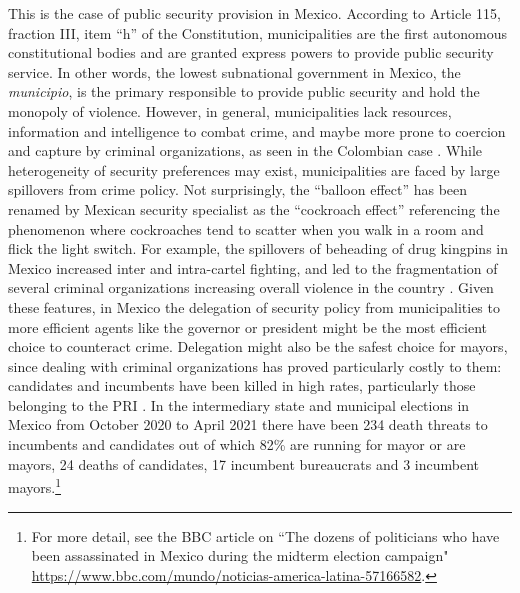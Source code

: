 This is the case of public security provision in Mexico. According to Article 115, fraction III, item ``h'' of the Constitution, municipalities are the first autonomous constitutional bodies and are granted express powers to provide public security service. In other words, the lowest subnational government in Mexico, the \emph{municipio}, is the primary responsible to provide public security and hold the monopoly of violence. However, in general, municipalities lack resources, information and intelligence to combat crime, and maybe more prone to coercion and capture by criminal organizations, as seen in the Colombian case \citep{chacon_2018}. While heterogeneity of security preferences may exist, municipalities are faced by large spillovers from crime policy. Not surprisingly, the ``balloon effect'' has been renamed by Mexican security specialist as the ``cockroach effect'' referencing the phenomenon where cockroaches tend to scatter when you walk in a room and flick the light switch. For example, the spillovers of beheading of drug kingpins in Mexico increased inter and intra-cartel fighting, and led to the fragmentation of several criminal organizations increasing overall violence in the country \citep{guerrero_2011}. Given these features, in Mexico the delegation of security policy from municipalities to more efficient agents like the governor or president might be the most efficient choice to counteract crime. Delegation might also be the safest choice for mayors, since dealing with criminal organizations has proved particularly costly to them: candidates and incumbents have been killed in high rates, particularly those belonging to the PRI \citep{ley_trejo_2020}. In the intermediary state and municipal elections in Mexico from October 2020 to April 2021 there have been 234 death threats to incumbents and candidates out of which 82\% are running for mayor or are mayors, 24 deaths of candidates, 17 incumbent bureaucrats and 3 incumbent mayors.\footnote{For more detail, see the BBC article on ``The dozens of politicians who have been assassinated in Mexico during the midterm election campaign" \url{https://www.bbc.com/mundo/noticias-america-latina-57166582}.} 

